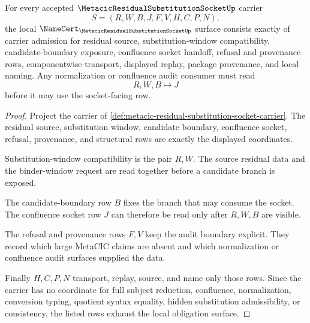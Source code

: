 \begin{theorem}
\label{thm:metacic-residual-substitution-socket-namecert-obligations}
For every accepted $\MetacicResidualSubstitutionSocketUp$ carrier
$$
S=(R,W,B,J,F,V,H,C,P,N),
$$
the local $\NameCert_{\MetacicResidualSubstitutionSocketUp}$ surface consists exactly of carrier admission for residual source, substitution-window compatibility, candidate-boundary exposure, confluence socket handoff, refusal and provenance rows, componentwise transport, displayed replay, package provenance, and local naming. Any normalization or confluence audit consumer must read
$$
R,W,B \longmapsto J
$$
before it may use the socket-facing row.
\end{theorem}
\begin{proof}
Project the carrier of \autoref{def:metacic-residual-substitution-socket-carrier}. The residual source, substitution window, candidate boundary, confluence socket, refusal, provenance, and structural rows are exactly the displayed coordinates.

Substitution-window compatibility is the pair $R,W$. The source residual data and the binder-window request are read together before a candidate branch is exposed.

The candidate-boundary row $B$ fixes the branch that may consume the socket. The confluence socket row $J$ can therefore be read only after $R,W,B$ are visible.

The refusal and provenance rows $F,V$ keep the audit boundary explicit. They record which large MetaCIC claims are absent and which normalization or confluence audit surfaces supplied the data.

Finally $H,C,P,N$ transport, replay, source, and name only those rows. Since the carrier has no coordinate for full subject reduction, confluence, normalization, conversion typing, quotient syntax equality, hidden substitution admissibility, or consistency, the listed rows exhaust the local obligation surface.
\end{proof}

